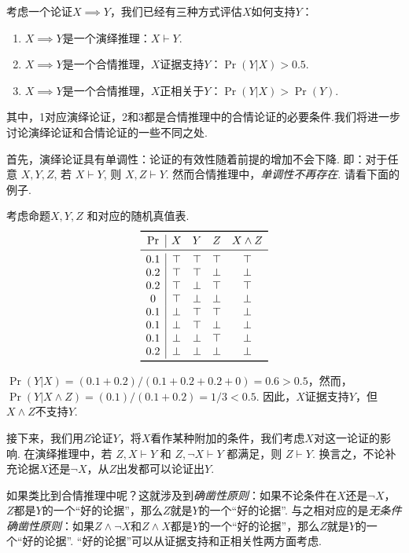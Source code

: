 考虑一个论证$X\implies Y$，我们已经有三种方式评估$X$如何支持$Y$：
    \begin{enumerate}
        \item $X\implies Y$是一个演绎推理：$X\vdash Y$.
        \item $X\implies Y$是一个合情推理，$X$证据支持$Y$：$\Pr(Y|X) > 0.5$.
        \item $X\implies Y$是一个合情推理，$X$正相关于$Y$：$\Pr(Y|X) > \Pr(Y)$.
    \end{enumerate}
其中，1对应演绎论证，2和3都是合情推理中的合情论证的必要条件.我们将进一步讨论演绎论证和合情论证的一些不同之处.

首先，演绎论证具有单调性：论证的有效性随着前提的增加不会下降. 即：对于任意 $X, Y, Z$, 若 $X\vdash Y$, 则 $X,Z\vdash Y$. 然而合情推理中，\textit{单调性不再存在}. 请看下面的例子.

\begin{example}[非单调性：例子]
考虑命题$X, Y, Z$ 和对应的随机真值表.
\[\begin{array}{c|ccccc}
        \toprule
        \Pr & X & Y & Z & X \wedge Z \\ \midrule
        0.1 & \T & \T & \T & \T\\
        0.2 & \T & \T & \F & \F\\
        0.2 & \T & \F & \T & \T\\
        0 & \T & \F & \F & \F\\ 
        0.1 & \F & \T & \T & \F\\ 
        0.1 & \F & \T & \F & \F\\
        0.1 & \F & \F & \T & \F\\
        0.2 & \F & \F & \F & \F\\
        \bottomrule
\end{array}\]

$\Pr(Y|X) = (0.1 + 0.2) / (0.1 + 0.2 + 0.2 + 0) = 0.6 > 0.5$，然而，$\Pr(Y|X \wedge Z) = (0.1) / (0.1 + 0.2) = 1/3 < 0.5$. 因此，$X$证据支持$Y$，但$X\wedge Z$不支持$Y$.
\end{example}

接下来，我们用$Z$论证$Y$，将$X$看作某种附加的条件，我们考虑$X$对这一论证的影响. 在演绎推理中，若 $Z,X\vdash Y$ 和 $Z,\neg X\vdash Y$ 都满足，则 $Z\vdash Y$. 换言之，不论补充论据$X$还是$\neg X$，从$Z$出发都可以论证出$Y$. 

如果类比到合情推理中呢？这就涉及到\textit{确凿性原则}：如果不论条件在$X$还是$\neg X$，$Z$都是$Y$的一个“好的论据”，那么$Z$就是$Y$的一个“好的论据”. 与之相对应的是\textit{无条件确凿性原则}：如果$Z\wedge\neg X$和$Z\wedge X$都是$Y$的一个“好的论据”，那么$Z$就是$Y$的一个“好的论据”. “好的论据”可以从证据支持和正相关性两方面考虑.

